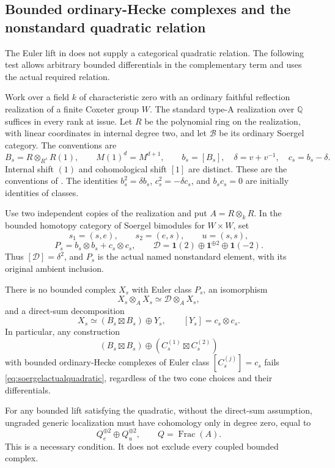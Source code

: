 \subsection{Bounded ordinary-Hecke complexes and the nonstandard quadratic relation}

The Euler lift in  does not supply a categorical quadratic
relation. The following test allows arbitrary bounded differentials in
the complementary term and uses the actual required relation.

Work over a field \(k\) of characteristic zero with an ordinary faithful
reflection realization of a finite Coxeter group \(W\). The standard
type-A realization over \(\mathbb Q\) suffices in every rank at issue.
Let \(R\) be the polynomial ring on the realization, with linear
coordinates in internal degree two, and let \(\mathcal B\) be its
ordinary Soergel category. The conventions are
\[
 B_s=R\otimes_{R^s}R(1),\qquad
 M(1)^d=M^{d+1},\qquad b_s=[B_s],\quad
 \delta=v+v^{-1},\quad c_s=b_s-\delta.
\]
Internal shift \((1)\) and cohomological shift \([1]\) are distinct.
These are the conventions of \cite[\S\S3.3--3.5,
pp.~1105--1108]{EW}. The identities
\(b_s^2=\delta b_s\), \(c_s^2=-\delta c_s\), and
\(b_sc_s=0\) are initially identities of classes.

Use two independent copies of the realization and put
\(A=R\otimes_kR\). In the bounded homotopy category of
Soergel bimodules for \(W\times W\), set
\[
 s_1=(s,e),\qquad s_2=(e,s),\qquad u=(s,s),
\]
\[
 P_s=b_s\otimes b_s+c_s\otimes c_s,
 \qquad
 \mathscr D=\mathbf1(2)\oplus\mathbf1^{\oplus2}
                        \oplus\mathbf1(-2).
\]
Thus \([\mathscr D]=\delta^2\), and \(P_s\) is the actual
named nonstandard element, with its original ambient inclusion.

\begin{finding}
\label{f:soergelderivedquadratic}
There is no bounded complex \(X_s\) with Euler class \(P_s\),
an isomorphism
\begin{equation}\label{eq:soergelactualquadratic}
 X_s\otimes_A X_s\simeq\mathscr D\otimes_A X_s,
\end{equation}
and a direct-sum decomposition
\begin{equation}\label{eq:soergelsplithypothesis}
 X_s\simeq(B_s\boxtimes B_s)\oplus Y_s,
 \qquad [Y_s]=c_s\otimes c_s.
\end{equation}
In particular, any construction
\[
 (B_s\boxtimes B_s)\oplus
 (C_s^{(1)}\boxtimes C_s^{(2)})
\]
with bounded ordinary-Hecke complexes of Euler class
\([C_s^{(j)}]=c_s\) fails
\eqref{eq:soergelactualquadratic}, regardless of the two cone
choices and their differentials.

For any bounded lift satisfying the quadratic, without the
direct-sum assumption, ungraded generic localization must have
cohomology only in degree zero, equal to
\[
                    Q_e^{\oplus2}\oplus Q_u^{\oplus2},
 \qquad Q=\operatorname{Frac}(A).
\]
This is a necessary condition. It does not exclude every
coupled bounded complex.
\end{finding}

